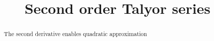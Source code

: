\documentclass{ximera}
\title{Second order Talyor series}
\begin{document}
	\begin{abstract}
		The second derivative enables quadratic approximation
	\end{abstract}
\end{document}
